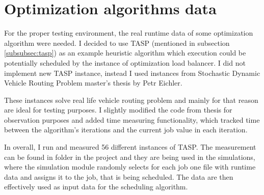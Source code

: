 \section{Optimization algorithms data}\label{sec:optimization-algorithms-data}
For the proper testing environment,
the real runtime data of some optimization algorithm were needed.
I decided to use TASP (mentioned in subsection \ref{subsubsec:tasp}) as an example heuristic algorithm
which execution could be potentially scheduled by the instance of optimization load balancer.
I did not implement new TASP instance,
instead I used instances from Stochastic Dynamic Vehicle Routing Problem master's thesis by Petr Eichler\cite{Eichler:Petr:2003}.

These instances solve real life vehicle routing problem 
and mainly for that reason are ideal for testing purposes.
I slightly modified the code from thesis for observation purposes
and added time measuring functionality,
which tracked time between the algorithm's iterations and the current job value in each iteration.

In overall,
I run and measured 56 different instances of TASP.
The measurement can be found in  folder in the project
and they are being used in the simulations,
where the simulation module randomly selects for each job one file with runtime data
and assigns it to the job, that is being scheduled.
The data are then effectively used as input data for the scheduling algorithm.